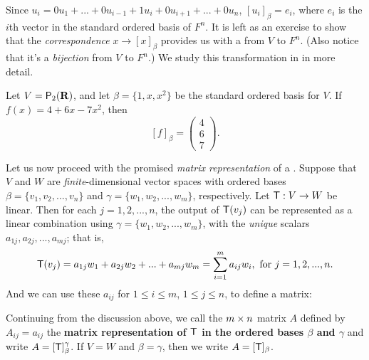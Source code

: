 \begin{note}
Since \(u_i = 0 u_1 + ... + 0 u_{i - 1} + 1 u_i + 0 u_{i + 1} + ... + 0 u_n\), \([u_i]_{\beta} = e_i\), where \(e_i\) is the \(i\)th vector in the standard ordered basis of \(F^{n}\).
It is left as an exercise to show that the \emph{correspondence} \(x \to [x]_{\beta}\) provides us with a \LTRAN{} from \(V\) to \(F^n\).
(Also notice that it's a \emph{bijection} from \(V\) to \(F^n\).)
We study this transformation in  in more
detail.
\end{note}

\begin{example} \label{example 2.2.2}
Let \(V = \textsf{P}_2(\mathbf{R})\), and let \(\beta = \{ 1, x , x^2 \}\) be the standard ordered basis for \(V\).
If \(f(x) = 4 + 6x - 7x^2\), then
\[
    [f]_{\beta} = \begin{pmatrix} 4 \\ 6 \\ 7 \end{pmatrix}.
\]
\end{example}

Let us now proceed with the promised \emph{matrix representation} of a \LTRAN{}.
Suppose that \(V\) and \(W\) are \emph{finite}-dimensional vector spaces with ordered bases \(\beta = \{ v_1, v_2, ..., v_n \}\) and \(\gamma = \{ w_1, w_2, ..., w_m \}\), respectively.
Let \(\textsf{T} : V \to W\) be linear.
Then for each \(j = 1, 2, ..., n\), the output of \(\textsf{T}(v_j)\) can be represented as a linear combination using \(\gamma = \{ w_1, w_2, ..., w_m \}\), with the \emph{unique} scalars \(a_{1j}, a_{2j}, ..., a_{mj}\);
that is,
\[
    \textsf{T}(v_j) = a_{1j} w_1 + a_{2j} w_2 + ... + a_{mj} w_m = \sum_{i = 1}^m a_{ij} w_i, \text{ for } j = 1, 2, ..., n.
\]
And we can use these \(a_{ij}\) for \(1 \le i \le m\), \(1 \le j \le n\), to define a matrix:

\begin{definition} \label{def 2.6}
Continuing from the discussion above, we call the \(m \times n\) matrix \(A\) defined by \(A_{ij} = a_{ij}\) the \textbf{matrix representation of \(\textsf{T}\) in the ordered bases \(\beta\)
and \(\gamma\)} and write \(A = [\textsf{T}]_{\beta}^{\gamma}\).
If \(V = W\) and \(\beta = \gamma\), then we write \(A = [\textsf{T}]_{\beta}\).
\end{definition}

